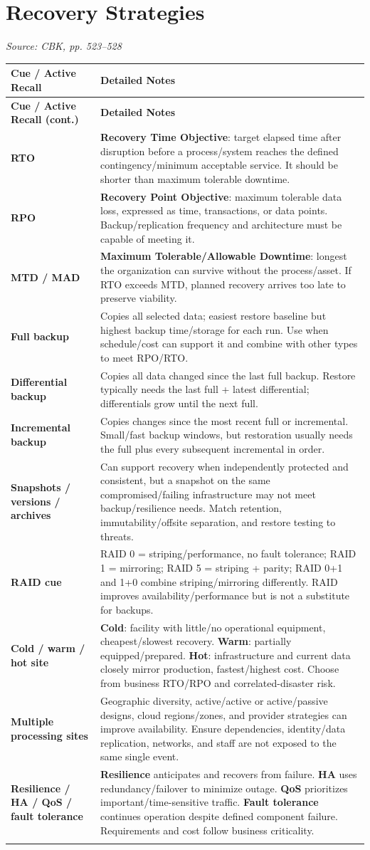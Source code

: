 \documentclass[10pt,letterpaper]{article}
\makeatletter
\newenvironment{cornell}{\rowcolors{2}{white}{notebg}\begin{longtable}{@{}>{\raggedright\arraybackslash\columncolor{cuebg}\color{navy}\bfseries}p{0.285\textwidth}>{\raggedright\arraybackslash}p{0.65\textwidth}@{}}\rowcolor{navy}\color{white}\textbf{Cue / Active Recall} & \color{white}\textbf{Detailed Notes}\\ \hline\endfirsthead\rowcolor{navy}\color{white}\textbf{Cue / Active Recall (cont.)} & \color{white}\textbf{Detailed Notes}\\ \hline\endhead}{\end{longtable}}
\newcommand{\noterow}[2]{#1 & #2\\\arrayrulecolor{line}\hline}\newcommand{\source}[1]{\par{\footnotesize\color{teal}\textit{Source: CBK, #1}}\par}
\makeatother
\begin{document}
\section{\color{navy}Recovery Strategies}
\source{pp. 523--528}
\begin{cornell}
\noterow{RTO}{\textbf{Recovery Time Objective}: target elapsed time after disruption before a process/system reaches the defined contingency/minimum acceptable service. It should be shorter than maximum tolerable downtime.}
\noterow{RPO}{\textbf{Recovery Point Objective}: maximum tolerable data loss, expressed as time, transactions, or data points. Backup/replication frequency and architecture must be capable of meeting it.}
\noterow{MTD / MAD}{\textbf{Maximum Tolerable/Allowable Downtime}: longest the organization can survive without the process/asset. If RTO exceeds MTD, planned recovery arrives too late to preserve viability.}
\noterow{Full backup}{Copies all selected data; easiest restore baseline but highest backup time/storage for each run. Use when schedule/cost can support it and combine with other types to meet RPO/RTO.}
\noterow{Differential backup}{Copies all data changed since the last full backup. Restore typically needs the last full + latest differential; differentials grow until the next full.}
\noterow{Incremental backup}{Copies changes since the most recent full or incremental. Small/fast backup windows, but restoration usually needs the full plus every subsequent incremental in order.}
\noterow{Snapshots / versions / archives}{Can support recovery when independently protected and consistent, but a snapshot on the same compromised/failing infrastructure may not meet backup/resilience needs. Match retention, immutability/offsite separation, and restore testing to threats.}
\noterow{RAID cue}{RAID 0 = striping/performance, no fault tolerance; RAID 1 = mirroring; RAID 5 = striping + parity; RAID 0+1 and 1+0 combine striping/mirroring differently. RAID improves availability/performance but is not a substitute for backups.}
\noterow{Cold / warm / hot site}{\textbf{Cold}: facility with little/no operational equipment, cheapest/slowest recovery. \textbf{Warm}: partially equipped/prepared. \textbf{Hot}: infrastructure and current data closely mirror production, fastest/highest cost. Choose from business RTO/RPO and correlated-disaster risk.}
\noterow{Multiple processing sites}{Geographic diversity, active/active or active/passive designs, cloud regions/zones, and provider strategies can improve availability. Ensure dependencies, identity/data replication, networks, and staff are not exposed to the same single event.}
\noterow{Resilience / HA / QoS / fault tolerance}{\textbf{Resilience} anticipates and recovers from failure. \textbf{HA} uses redundancy/failover to minimize outage. \textbf{QoS} prioritizes important/time-sensitive traffic. \textbf{Fault tolerance} continues operation despite defined component failure. Requirements and cost follow business criticality.}
\end{cornell}
\end{document}
